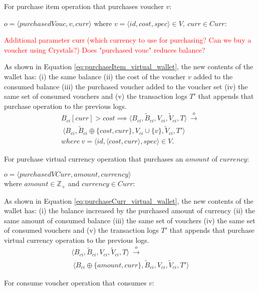 \begin{enumerate}
	For purchase item operation that purchases voucher $v$:
		
	$o = \langle purchasedVouc, v, curr \rangle$ where $v=\langle id, cost, spec \rangle \in V, ~ curr \in Curr$:
	
	\textcolor{red}{Additional parameter curr (which currency to use for purchasing? Can we buy a voucher using Crystals?) Does "purchased vouc" reduces balance? }
	
	As shown in Equation \ref{eq:purchaseItem_virtual_wallet}, the new contents of the wallet has: (i) the same balance (ii) the cost of the voucher $v$ added to the consumed balance (iii) the purchased voucher added to the voucher set (iv) the same set of consumed vouchers and (v) the transaction logs $T'$ that appends that purchase operation to the previous logs.	
	\begin{multline} \label{eq:purchaseItem_virtual_wallet}
		 B_{ci}[curr] > cost \implies \langle B_{ci}, \widetilde{B}_{ci}, V_{ci}, \widetilde{V}_{ci}, T \rangle ~ \overset{o}{\rightarrow} \\
	    ~ \langle B_{ci}, \widetilde{B}_{ci} \oplus \{cost, curr\}, V_{ci} \cup \{v\}, \widetilde{V}_{ci}, T' \rangle \\
	    where ~ v = \langle id, \langle cost, curr \rangle, spec \rangle \in V.
	\end{multline}
	
	For purchase virtual currency operation that purchases an $amount$ of $currency$:
	
	$o = \langle purchasedVCurr, amount, currency \rangle$ \\ 
	where $amount \in \mathbb{Z}_{+}$ and $currency \in Curr$:
	
	As shown in Equation \ref{eq:purchaseCurr_virtual_wallet}, the new contents of the wallet has: (i) the balance increased by the purchased amount of currency (ii) the same amount of consumed balance (iii) the same set of vouchers (iv) the same set of consumed vouchers and (v) the transaction logs $T'$ that appends that purchase virtual currency operation to the previous logs.	
	\begin{multline} \label{eq:purchaseCurr_virtual_wallet}
	    \langle B_{ci}, \widetilde{B}_{ci}, V_{ci}, \widetilde{V}_{ci}, T \rangle ~ \overset{o}{\rightarrow} \\
	    ~ \langle B_{ci} \oplus \{amount, curr\}, \widetilde{B}_{ci}, V_{ci}, \widetilde{V}_{ci}, T' \rangle
	\end{multline}
	
	For consume voucher operation that consumes $v$:
	

\end{enumerate}
